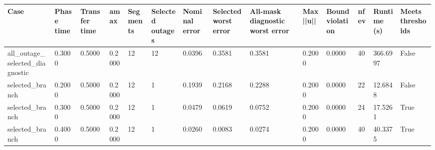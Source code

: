 \begin{tabular}{llllllllllllll}
\toprule
Case & Phase time & Transfer time & amax & Segments & Selected outages & Nominal error & Selected worst error & All-mask diagnostic worst error & Max ||u|| & Bound violation & nfev & Runtime (s) & Meets thresholds \\
\midrule
all\_outage\_selected\_diagnostic & 0.3000 & 0.5000 & 0.2000 & 12 & 12 & 0.0396 & 0.3581 & 0.3581 & 0.2000 & 0.0000 & 40 & 366.6997 & False \\
selected\_branch & 0.2000 & 0.5000 & 0.2000 & 12 & 1 & 0.1939 & 0.2168 & 0.2288 & 0.2000 & 0.0000 & 22 & 12.6848 & False \\
selected\_branch & 0.3000 & 0.5000 & 0.2000 & 12 & 1 & 0.0479 & 0.0619 & 0.0752 & 0.2000 & 0.0000 & 24 & 17.5261 & True \\
selected\_branch & 0.4000 & 0.5000 & 0.2000 & 12 & 1 & 0.0260 & 0.0083 & 0.0274 & 0.2000 & 0.0000 & 40 & 40.3375 & True \\
\bottomrule
\end{tabular}
